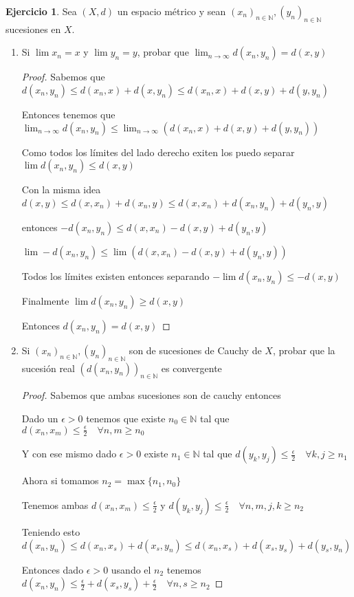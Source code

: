 \documentclass[12pt]{report}
\newcommand{\N}{\mathbb{N}}
\newcommand{\ra}{\rightarrow}
\theoremstyle{definition}
\newtheorem{ej}{Ejercicio}
\begin{document}
\begin{ej}
  Sea $(X,d)$ un espacio métrico y sean $(x_n)_{n \in \N}, (y_n)_{n \in \N}$ sucesiones en $X$.
  \begin{enumerate}
    \item Si $\lim x_n = x$ y $\lim y_n = y$, probar que $\lim_{n \ra \infty} d(x_n,y_n) = d(x,y)$ 
      \begin{proof}
	Sabemos que $d(x_n , y_n) \leq d(x_n,x) + d(x,y_n) \leq d(x_n,x) + d(x,y) + d(y,y_n)$

	Entonces tenemos que $\lim_{n \ra \infty} d(x_n,y_n) \leq \lim_{n \ra \infty}{(d(x_n,x) + d(x,y) + d(y,y_n))}$

	Como todos los límites del lado derecho exiten los puedo separar $\lim d(x_n,y_n) \leq d(x,y)$

	Con la misma idea $d(x,y) \leq d(x,x_n) + d(x_n,y) \leq d(x,x_n) + d(x_n,y_n) + d(y_n ,y)$

	entonces $- d(x_n,y_n) \leq d(x,x_n) - d(x,y) + d(y_n,y)$

	$\lim - d(x_n,y_n) \leq \lim (d(x,x_n) - d(x,y) + d(y_n,y)) $ 

	Todos los límites existen entonces separando $-\lim d(x_n,y_n) \leq -d(x,y)$

	Finalmente $\lim d(x_n,y_n) \geq d(x,y)$

	Entonces $d(x_n,y_n) = d(x,y)$
      \end{proof}
      \newpage
    \item Si $(x_n)_{n \in \N}, (y_n)_{n \in \N}$ son de sucesiones de Cauchy de $X$, probar que la sucesión real $(d(x_n,y_n))_{n \in \N}$ es convergente
      \begin{proof}
	Sabemos que ambas sucesiones son de cauchy entonces 

	Dado un $\epsilon > 0$ tenemos que existe $n_0 \in \N$ tal que $d(x_n,x_m) \leq \frac{\epsilon}{2} \quad \forall n,m \geq n_0$

	Y con ese mismo dado $\epsilon > 0$ existe $n_1\in \N$ tal que $d(y_k,y_j) \leq \frac{\epsilon}{2} \quad \forall k,j\geq n_1 $

	Ahora si tomamos $n_2 = \max{\{n_1 ,n_0\}}$

	Tenemos ambas $d(x_n,x_m) \leq \frac{\epsilon}{2}$ y $d(y_k,y_j) \leq \frac{\epsilon}{2} \quad \forall n,m,j,k \geq n_2$


	Teniendo esto $d(x_n,y_n) \leq d(x_n ,x_{s}) + d(x_{s},y_n) \leq d(x_n,x_{s}) + d(x_{s},y_{s}) + d(y_{s},y_n)$

	Entonces dado $\epsilon > 0$ usando el $n_2$ tenemos $d(x_n,y_n) \leq \frac{\epsilon}{2} + d(x_s,y_s) + \frac{\epsilon}{2} \quad \forall n,s \geq n_2$


\end{proof}
\end{enumerate}
\end{ej}
\end{document}
